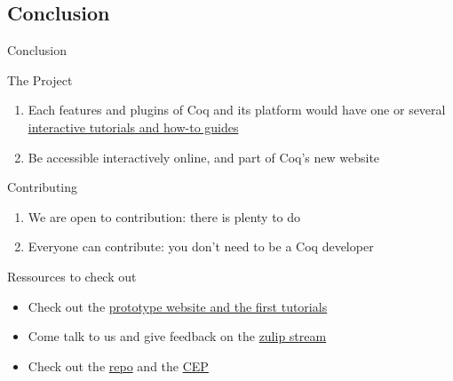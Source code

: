 \documentclass[10pt]{beamer}
\begin{document}
\subsection{Conclusion}


\begin{frame}[fragile]{Conclusion}
  \begin{tcbObj}{The Project}
    \begin{enumerate}
      \item Each features and plugins of Coq and its platform would have one
            or several \ul{interactive tutorials and how-to guides}
      \item Be accessible interactively online, and part of Coq's new website
    \end{enumerate}
  \end{tcbObj}
  \begin{tcbObj}{Contributing}
    \begin{enumerate}
      \item We are open to contribution: there is plenty to do
      \item Everyone can contribute: you don't need to be a Coq developer
    \end{enumerate}
  \end{tcbObj}
  \begin{tcbProp}{Ressources to check out}
    \begin{itemize}[label=$-$]
      \item Check out the \textcolor{blue}{\href{https://coq.inria.fr/platform-docs/}{prototype website and the first tutorials}}
      \item Come talk to us and give feedback on the \textcolor{blue}{\href{https://www.theozimmermann.net/platform-docs/}{zulip stream}}
      \item Check out the \textcolor{blue}{\href{https://github.com/coq/platform-docs}{repo}} and the \textcolor{blue}{\href{https://github.com/coq/ceps/pull/91}{CEP}}
    \end{itemize}
  \end{tcbProp}
\end{frame}
\end{document}
